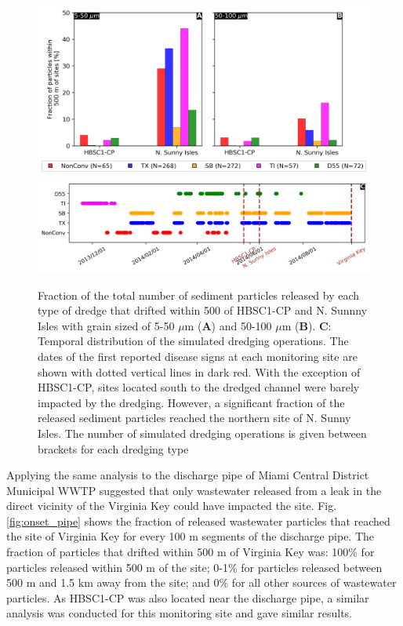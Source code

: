 \begin{figure}
	\centering
	\includegraphics[width=\textwidth]{chapters/onset/figures/aggregated_new.png}
	\includegraphics[width=\textwidth]{chapters/onset/figures/timeline.png}
	\caption{Fraction of the total number of sediment particles released by each type of dredge that drifted within 500 of HBSC1-CP and N. Sunnny Isles with grain sized of 5-50 $\mu$m (\textbf{A}) and 50-100 $\mu$m (\textbf{B}). \textbf{C}: Temporal distribution of the simulated dredging operations. The dates of the first reported disease signs at each monitoring site are shown with dotted vertical lines in dark red. With the exception of HBSC1-CP, sites located south to the dredged channel were barely impacted by the dredging. However, a significant fraction of the released sediment particles reached the northern site of N. Sunny Isles. The number of simulated dredging operations is given between brackets for each dredging type}
	\label{fig:onset_bar}
\end{figure}

Applying the same analysis to the discharge pipe of Miami Central District Municipal WWTP suggested that only wastewater released from a leak in the direct vicinity of the Virginia Key could have impacted the site. Fig. \ref{fig:onset_pipe} shows the fraction of released wastewater particles that reached the site of Virginia Key for every 100 m segments of the discharge pipe. The fraction of particles that drifted within 500 m of Virginia Key was: 100\% for particles released within 500 m of the site; 0-1\% for particles released between 500 m and 1.5 km away from the site; and 0\% for all other sources of wastewater particles. As HBSC1-CP was also located near the discharge pipe, a similar analysis was conducted for this monitoring site and gave similar results.

